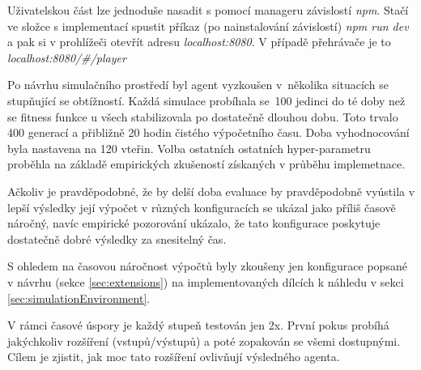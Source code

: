 Uživatelskou část lze jednoduše nasadit s pomocí manageru závislostí \emph{npm}. Stačí ve složce s implementací spustit příkaz (po nainstalování závislostí) \emph{npm run dev} a pak si v prohlížeči otevřít adresu \emph{localhost:8080}. V případě přehrávače je to \emph{localhost:8080/\#/player}

Po návrhu simulačního prostředí byl agent vyzkoušen v~několika situacích se stupňující se obtížností. Každá simulace probíhala se~100 jedinci do té doby než se fitness funkce u všech stabilizovala po dostatečně dlouhou dobu. Toto trvalo 400 generací a přibližně 20 hodin čistého výpočetního času. Doba vyhodnocování byla nastavena na 120 vteřin. Volba ostatních ostatních hyper-parametru proběhla na základě empirických zkušeností získaných v průběhu implemetnace. 

Ačkoliv je pravděpodobné, že by delší doba evaluace by pravděpodobně vyústila v lepší výsledky její výpočet v různých konfiguracích se ukázal jako příliš časově náročný, navíc empirické pozorování ukázalo, že tato konfigurace poskytuje dostatečně dobré výsledky za snesitelný čas. 

S ohledem na časovou náročnost výpočtů byly zkoušeny jen konfigurace popsané v návrhu (sekce \ref{sec:extensions}) na implementovaných dílcích k náhledu v sekci \ref{sec:simulationEnvironment}.

V rámci časové úspory je každý stupeň testován jen 2x. První pokus probíhá jakýchkoliv rozšíření (vstupů/výstupů) a poté zopakován se všemi dostupnými. Cílem je zjistit, jak moc tato rozšíření ovlivňují výsledného agenta.

